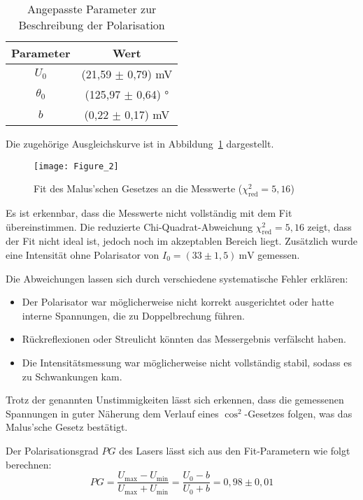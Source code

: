 \begin{table}[htbp]
    \centering
    \begin{tabular}{c|c}
        Parameter & Wert \\
        \hline
        $U_0$ & (21{,}59 \(\pm\) 0{,}79) mV \\
        $\theta_0$ & (125{,}97 \(\pm\) 0{,}64) ° \\
        $b$ & (0{,}22 \(\pm\) 0{,}17) mV \\
    \end{tabular}
    \caption{Angepasste Parameter zur Beschreibung der Polarisation}
    \label{tab:WertePol}
\end{table}

Die zugehörige Ausgleichskurve ist in Abbildung~\ref{fig:PolarisationFigur} dargestellt.

\begin{figure}[H]
    \centering
    \texttt{[image: Figure\_2]}
    \caption{Fit des Malus'schen Gesetzes an die Messwerte ($\chi^2_\text{red} = 5{,}16$)}
    \label{fig:PolarisationFigur}
\end{figure}

Es ist erkennbar, dass die Messwerte nicht vollständig mit dem Fit übereinstimmen.
Die reduzierte Chi-Quadrat-Abweichung $\chi^2_\text{red} = 5{,}16$ zeigt, dass der Fit nicht ideal ist, jedoch noch im akzeptablen Bereich liegt. 
Zusätzlich wurde eine Intensität ohne Polarisator von $I_0 = (33 \pm 1{,}5)~\text{mV}$ gemessen.

Die Abweichungen lassen sich durch verschiedene systematische Fehler erklären:

\begin{itemize}
    \item Der Polarisator war möglicherweise nicht korrekt ausgerichtet oder hatte interne Spannungen, die zu Doppelbrechung führen.
    \item Rückreflexionen oder Streulicht könnten das Messergebnis verfälscht haben.
    \item Die Intensitätsmessung war möglicherweise nicht vollständig stabil, sodass es zu Schwankungen kam.
\end{itemize}

Trotz der genannten Unstimmigkeiten lässt sich erkennen, dass die gemessenen Spannungen in guter Näherung dem Verlauf eines $\cos^2$-Gesetzes folgen, was das Malus’sche Gesetz bestätigt.

Der Polarisationsgrad \( PG \) des Lasers lässt sich aus den Fit-Parametern wie folgt berechnen:
\begin{equation*}
    PG = \frac{U_\text{max} - U_\text{min}}{U_\text{max} + U_\text{min}} = \frac{U_0 - b}{U_0 + b} = 0{,}98 \pm 0{,}01
\end{equation*}

